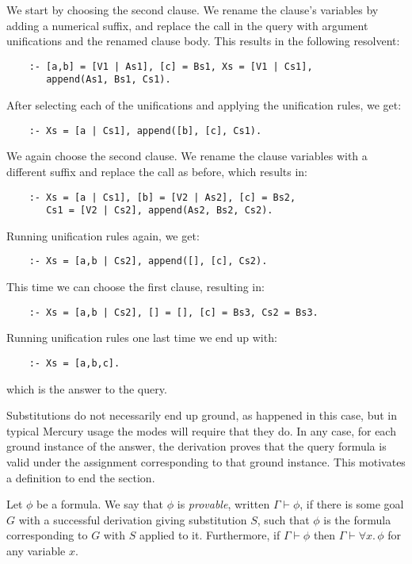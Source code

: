 We start by choosing the second clause.
We rename the clause's variables by adding a numerical suffix,
and replace the call in the query
with argument unifications and the renamed clause body.
This results in the following resolvent:
\begin{verbatim}
    :- [a,b] = [V1 | As1], [c] = Bs1, Xs = [V1 | Cs1],
       append(As1, Bs1, Cs1).
\end{verbatim}
After selecting each of the unifications
and applying the unification rules,
we get:
\begin{verbatim}
    :- Xs = [a | Cs1], append([b], [c], Cs1).
\end{verbatim}
We again choose the second clause.
We rename the clause variables with a different suffix
and replace the call as before,
which results in:
\begin{verbatim}
    :- Xs = [a | Cs1], [b] = [V2 | As2], [c] = Bs2,
       Cs1 = [V2 | Cs2], append(As2, Bs2, Cs2).
\end{verbatim}
Running unification rules again, we get:
\begin{verbatim}
    :- Xs = [a,b | Cs2], append([], [c], Cs2).
\end{verbatim}
This time we can choose the first clause,
resulting in:
\begin{verbatim}
    :- Xs = [a,b | Cs2], [] = [], [c] = Bs3, Cs2 = Bs3.
\end{verbatim}
Running unification rules one last time we end up with:
\begin{verbatim}
    :- Xs = [a,b,c].
\end{verbatim}
which is the answer to the query.

Substitutions do not necessarily end up ground,
as happened in this case,
but in typical Mercury usage
the modes will require that they do.
In any case,
for each ground instance of the answer,
the derivation proves that the query formula is valid
under the assignment corresponding to that ground instance.
This motivates a definition to end the section.

\begin{definition}[Provability]
Let $\phi$ be a formula.
We say that $\phi$ is \emph{provable\label{gi:provable}},
written $\Gamma \vdash \phi$,
if there is some goal $G$
with a successful derivation giving substitution $S$,
such that $\phi$ is the formula corresponding to
$G$ with $S$ applied to it.
Furthermore,
if $\Gamma \vdash \phi$
then $\Gamma \vdash \forall x.\, \phi$
for any variable $x$.
\end{definition}


